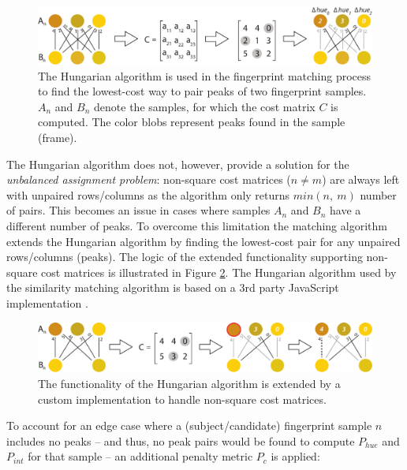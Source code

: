 \documentclass[thesis.tex]{subfiles}
\begin{document}
\begin{figure}[h]
\centering \includegraphics[width=\textwidth,height=\textheight,keepaspectratio=true]{images/design_implementation/hungarian_algorithm}
\caption{The Hungarian algorithm is used in the fingerprint matching process to find the lowest-cost way to pair peaks of two fingerprint samples. $A_n$ and $B_n$ denote the samples, for which the cost matrix $C$ is computed. The color blobs represent peaks found in the sample (frame). \label{figure:hungarian-algorithm}}
\end{figure}
\enlargethispage{1\baselineskip}

The Hungarian algorithm does not, however, provide a solution for the \emph{unbalanced assignment problem}: non-square cost matrices ($n \neq m$) are always left with unpaired rows/columns as the algorithm only returns $min (n,\ m)$ number of pairs. This becomes an issue in cases where samples $A_n$ and $B_n$ have a different number of peaks. To overcome this limitation the matching algorithm extends the Hungarian algorithm by finding the lowest-cost pair for any unpaired rows/columns (peaks). The logic of the extended functionality supporting non-square cost matrices is illustrated in Figure \ref{figure:hungarian-algorithm-extended}. The Hungarian algorithm used by the similarity matching algorithm is based on a 3rd party JavaScript implementation \cite{munkres-js}.

\begin{figure}
\centering \includegraphics[width=\textwidth,height=\textheight,keepaspectratio=true]{images/design_implementation/hungarian_algorithm_ext}
\caption{The functionality of the Hungarian algorithm is extended by a custom implementation to handle non-square cost matrices.\label{figure:hungarian-algorithm-extended}}
\end{figure}

To account for an edge case where a (subject/candidate) fingerprint sample $n$ includes no peaks -- and thus, no peak pairs would be found to compute $P_{hue}$ and $P_{int}$ for that sample -- an additional penalty metric $P_c$ is applied:
\end{document}
